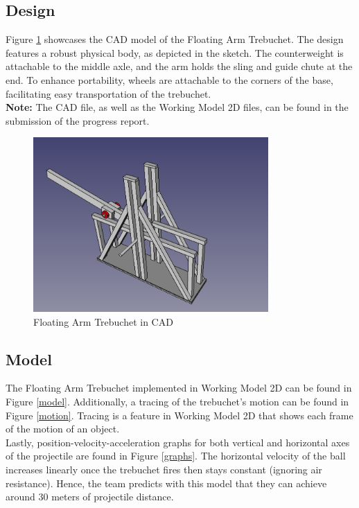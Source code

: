 \documentclass[12pt, titlepage]{article}
\begin{document}
    \subsection{Design}
    Figure \ref{CAD} showcases the CAD model of the Floating Arm Trebuchet. The design features a robust physical body, as depicted in the sketch. The counterweight is attachable to the middle axle, and the arm holds the sling and guide chute at the end. To enhance portability, wheels are attachable to the corners of the base, facilitating easy transportation of the trebuchet.\\[140pt]
    \textbf{Note:} The CAD file, as well as the Working Model 2D files, can be found in the submission of the progress report.   
    \begin{figure}[t]                                  
    \centering
    \includegraphics[width=0.8\textwidth]{CAD.png}
    \caption{Floating Arm Trebuchet in CAD\label{CAD}}
    \end{figure}
    \newpage
    \subsection{Model}
    The Floating Arm Trebuchet implemented in Working Model 2D can be found 
    in Figure \ref{model}. Additionally, a tracing of the trebuchet's motion 
    can be found in Figure \ref{motion}. Tracing is a feature in Working 
    Model 2D that shows each frame of the motion of an object.\\[10pt]
    Lastly, position-velocity-acceleration graphs for both vertical and 
    horizontal axes of the projectile are found in Figure \ref{graphs}.
    The horizontal velocity of the ball increases linearly once the trebuchet fires
    then stays constant (ignoring air resistance). Hence, the team predicts 
    with this model that they can achieve around 30 meters of projectile
    distance.
\end{document}
